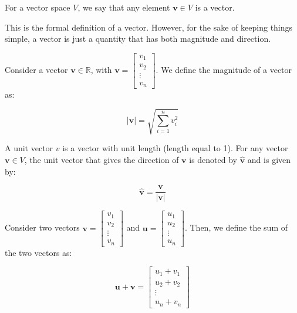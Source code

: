 \documentclass[12pt]{article}
\begin{document}
\begin{definition}[Vector]
    For a vector space $V$, we say that any element $\mathbf{v} \in V$ is a vector.
\end{definition}

This is the formal definition of a vector. However, for the sake of keeping things simple, a vector is just a quantity that has both magnitude and direction.

\begin{definition}
    Consider a vector $\mathbf{v} \in \mathbb{R}$, with $\mathbf{v} = \begin{bmatrix}
        v_1 \\
        v_2 \\
        \vdots \\
        v_n
    \end{bmatrix}$. We define the magnitude of a vector as:

    \[ \mathbf{|v|} = \sqrt{\sum_{i = 1}^n v_i^2} \]
\end{definition}

\begin{definition}
    A unit vector $v$ is a vector with unit length (length equal to 1). For any vector $\mathbf{v} \in V$, the unit vector that gives the direction of $\mathbf{v}$ is denoted by $\mathbf{\hat{v}}$ and is given by:

    \[ \mathbf{\hat{v}} = \frac{\mathbf{v}}{|\mathbf{v}|} \]
\end{definition}

\begin{definition}
    Consider two vectors $\mathbf{v} = \begin{bmatrix}
        v_1 \\
        v_2 \\
        \vdots \\
        v_n
    \end{bmatrix}$ and $\mathbf{u} = \begin{bmatrix}
        u_1 \\
        u_2 \\
        \vdots \\
        u_n
    \end{bmatrix}$. Then, we define the sum of the two vectors as:

    \[ \mathbf{u + v} = \begin{bmatrix}
        u_1 + v_1 \\
        u_2 + v_2 \\
        \vdots \\
        u_n + v_n 
    \end{bmatrix} \]
\end{definition}
\end{document}
